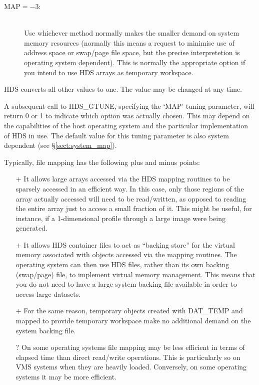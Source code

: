 \begin{description}
\begin{description}
\item[MAP$=-$3:]\mbox{}\\
Use whichever method normally makes the smaller demand on system memory
resources (normally this means a request to minimise use of address space or
swap/page file space, but the precise interpretetion is operating system
dependent). This is normally the appropriate option if you intend to use HDS
arrays as temporary workspace.
\end{description}

HDS converts all other values to one. The value may be changed at any time.

A subsequent call to HDS\_GTUNE, specifying the `MAP' tuning parameter, will
return 0 or 1 to indicate which option was actually chosen. This may depend on
the capabilities of the host operating system and the particular implementation
of HDS in use. The default value for this tuning parameter is also system
dependent (see \S\ref{sect:system_map}).

Typically, file mapping has the following plus and minus points:

\begin{itemize}

\item[$+$] It allows large arrays accessed via the HDS mapping routines to be
sparsely accessed in an efficient way. In this case, only those regions of the
array actually accessed will need to be read/written, as opposed to reading the
entire array just to access a small fraction of it. This might be useful, for
instance, if a 1-dimensional profile through a large image were being
generated.

\item[$+$] It allows HDS container files to act as ``backing store'' for the
virtual memory associated with objects accessed via the mapping routines. The
operating system can then use HDS files, rather than its own backing (swap/page)
file, to implement virtual memory management. This means that you do not need to
have a large system backing file available in order to access large datasets.

\item[$+$] For the same reason, temporary objects created with DAT\_TEMP
and mapped to provide temporary workspace make no additional demand on the
system backing file.

\item[$?$] On some operating systems file mapping may be less efficient in terms
of elapsed time than direct read/write operations. This is particularly so on
VMS systems when they are heavily loaded. Conversely, on some operating systems
it may be more efficient.


\end{itemize}
\end{description}
